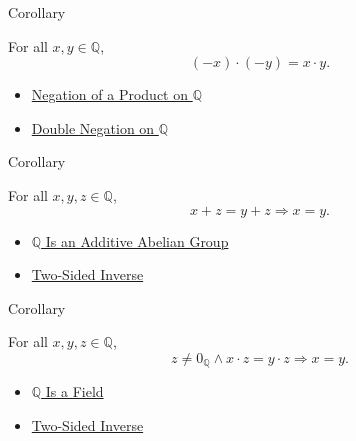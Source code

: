 \begin{corollarybox}{Corollary}
\begin{corollary}
\label{cor:product-of-negatives-on-q}
For all $x,y\in\mathbb{Q}$,
\[
(-x)\cdot(-y)=x\cdot y.
\]
\end{corollary}
\end{corollarybox}

\begin{dependencies}
\begin{itemize}
  \item \hyperref[cor:negation-of-product-on-q]{Negation of a Product on $\mathbb{Q}$}
  \item \hyperref[cor:double-negation-on-q]{Double Negation on $\mathbb{Q}$}
\end{itemize}
\end{dependencies}

\begin{corollarybox}{Corollary}
\begin{corollary}
\label{cor:additive-cancellation-on-q}
For all $x,y,z\in\mathbb{Q}$,
\[
x+z=y+z
\Longrightarrow
x=y.
\]
\end{corollary}
\end{corollarybox}

\begin{dependencies}
\begin{itemize}
  \item \hyperref[thm:q-additive-abelian-group]{$\mathbb{Q}$ Is an Additive Abelian Group}
  \item \hyperref[def:two-sided-inverse]{Two-Sided Inverse}
\end{itemize}
\end{dependencies}

\begin{corollarybox}{Corollary}
\begin{corollary}
\label{cor:multiplicative-cancellation-on-q}
For all $x,y,z\in\mathbb{Q}$,
\[
z\ne 0_{\mathbb{Q}}\land x\cdot z=y\cdot z
\Longrightarrow
x=y.
\]
\end{corollary}
\end{corollarybox}

\begin{dependencies}
\begin{itemize}
  \item \hyperref[thm:q-is-a-field]{$\mathbb{Q}$ Is a Field}
  \item \hyperref[def:two-sided-inverse]{Two-Sided Inverse}
\end{itemize}
\end{dependencies}

